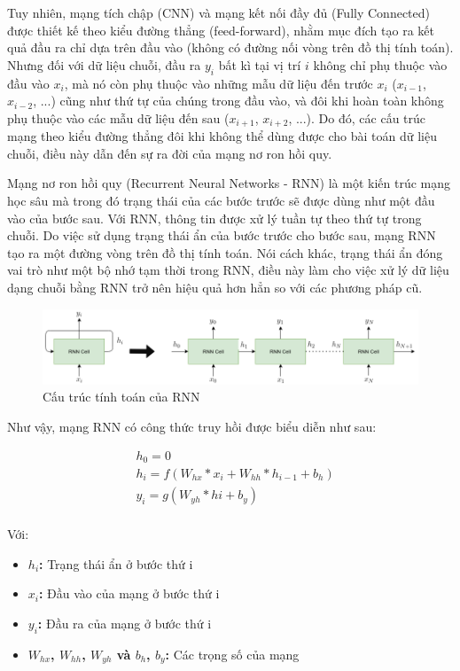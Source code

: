 Tuy nhiên, mạng tích chập (CNN) và mạng kết nối đầy đủ (Fully Connected) được thiết kế theo kiểu đường thẳng (feed-forward), nhằm mục đích tạo ra kết quả đầu ra chỉ dựa trên đầu vào (không có đường nối vòng trên đồ thị tính toán). Nhưng đối với dữ liệu chuỗi, đầu ra $y_i$ bất kì tại vị trí $i$ không chỉ phụ thuộc vào đầu vào $x_i$, mà nó còn phụ thuộc vào những mẫu dữ liệu đến trước $x_i$ ($x_{i-1}$, $x_{i-2}$, ...) cũng như thứ tự của chúng trong đầu vào, và đôi khi hoàn toàn không phụ thuộc vào các mẫu dữ liệu đến sau ($x_{i+1}$, $x_{i+2}$, ...). Do đó, các cấu trúc mạng theo kiểu đường thẳng đôi khi không thể dùng được cho bài toán dữ liệu chuỗi, điều này dẫn đến sự ra đời của mạng nơ ron hồi quy.

Mạng nơ ron hồi quy (Recurrent Neural Networks - RNN) là một kiến trúc mạng học sâu mà trong đó trạng thái của các bước trước sẽ được dùng như một đầu vào của bước sau. Với RNN, thông tin được xử lý tuần tự theo thứ tự trong chuỗi. Do việc sử dụng trạng thái ẩn của bước trước cho bước sau, mạng RNN tạo ra một đường vòng trên đồ thị tính toán. Nói cách khác, trạng thái ẩn đóng vai trò như một bộ nhớ tạm thời trong RNN, điều này làm cho việc xử lý dữ liệu dạng chuỗi bằng RNN trở nên hiệu quả hơn hẳn so với các phương pháp cũ.

\begin{figure}[H]
    \centering
    \includegraphics[width=15cm]{./content/materials/rnns.png}
    \caption{Cấu trúc tính toán của RNN}
\end{figure}

Như vậy, mạng RNN có công thức truy hồi được biểu diễn như sau:

\begin{equation}
\begin{split}
    &h_0=0\\
    &h_i=f(W_{hx}*x_i+W_{hh}*h_{i-1}+b_h)\\
    &y_i=g(W_{yh}*hi+b_y)\\
\end{split}
\end{equation}

Với:
\begin{itemize}
    \item \textbf{$h_i$:} Trạng thái ẩn ở bước thứ i
    \item \textbf{$x_i$:} Đầu vào của mạng ở bước thứ i
    \item \textbf{$y_i$:} Đầu ra của mạng ở bước thứ i
    \item \textbf{$W_{hx}$, $W_{hh}$, $W_{yh}$ và $b_h$, $b_y$:} Các trọng số của mạng 
\end{itemize}

